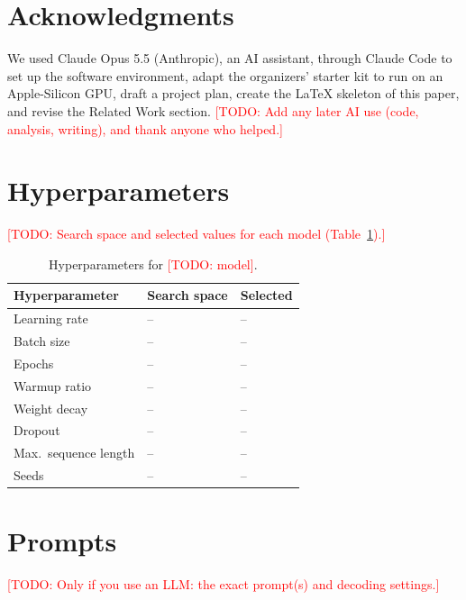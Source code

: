 \documentclass[11pt]{article}
\newcommand{\todo}[1]{\textcolor{red}{[TODO: #1]}}
\begin{document}
\section*{Acknowledgments}
We used Claude Opus 5.5 (Anthropic), an AI assistant, through Claude Code to set up the software environment, adapt the organizers' starter kit to run on an Apple-Silicon GPU, draft a project plan, create the \LaTeX{} skeleton of this paper, and revise the Related Work section.
\todo{Add any later AI use (code, analysis, writing), and thank anyone who helped.}



\appendix

\section{Hyperparameters}
\label{app:hyperparams}

\todo{Search space and selected values for each model (Table~\ref{tab:hyperparams}).}

\begin{table}[h]
  \centering
  \small
  \begin{tabular}{@{}lll@{}}
    \toprule
    \textbf{Hyperparameter} & \textbf{Search space} & \textbf{Selected} \\
    \midrule
    Learning rate          & -- & -- \\
    Batch size             & -- & -- \\
    Epochs                 & -- & -- \\
    Warmup ratio           & -- & -- \\
    Weight decay           & -- & -- \\
    Dropout                & -- & -- \\
    Max.\ sequence length  & -- & -- \\
    Seeds                  & -- & -- \\
    \bottomrule
  \end{tabular}
  \caption{Hyperparameters for \todo{model}.}
  \label{tab:hyperparams}
\end{table}

\section{Prompts}
\label{app:prompts}

\todo{Only if you use an LLM: the exact prompt(s) and decoding settings.}
\end{document}
